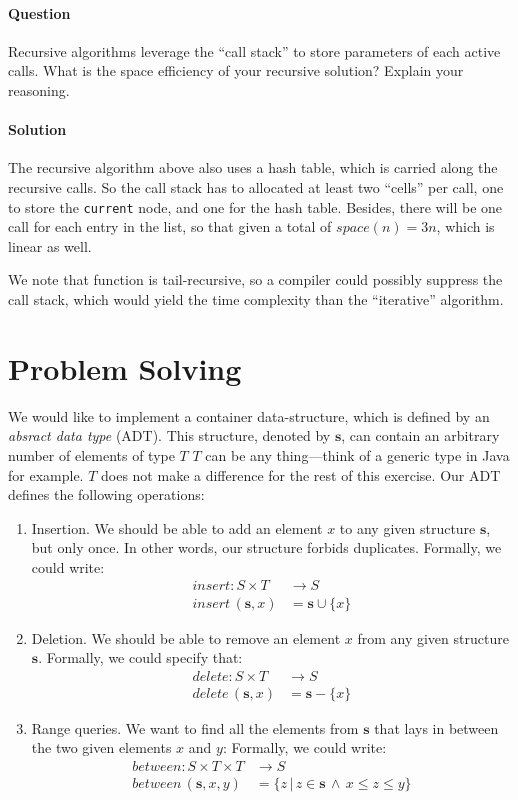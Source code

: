 \documentclass{article}
\begin{document}
\paragraph{Question} Recursive algorithms leverage the ``call stack''
to store parameters of each active calls. What is the space efficiency
of your recursive solution?  Explain your reasoning.

\paragraph{Solution} The recursive algorithm above also uses a hash
table, which is carried along the recursive calls. So the call stack
has to allocated at least two ``cells'' per call, one to store the
\texttt{current} node, and one for the hash table. Besides, there will
be one call for each entry in the list, so that given a total of
$space(n) = 3n$, which is linear as well.

We note that function is tail-recursive, so a compiler could possibly
suppress the call stack, which would yield the time complexity than
the ``iterative'' algorithm.

\section{Problem Solving}
We would like to implement a container data-structure, which is
defined by an \emph{absract data type} (ADT). This structure, denoted
by $\mathbf{s}$, can contain an arbitrary number of elements of type
$T$ $T$ can be any thing---think of a generic type in Java for
example. $T$ does not make a difference for the rest of this
exercise. Our ADT defines the following operations:
\begin{enumerate}
\item Insertion. We should be able to add an element $x$ to any given
  structure $\mathbf{s}$, but only once. In other words, our
  structure forbids duplicates. Formally, we could write:
  \begin{align*}
    \mathit{insert}: S \times T & \to S \\
    \mathit{insert}\, (\mathbf{s}, x) &= \mathbf{s} \cup \{ x \}
  \end{align*}
\item Deletion. We should be able to remove an element $x$ from any given 
  structure $\mathbf{s}$. Formally, we could specify that: 
  \begin{align*}
    \mathit{delete}: S \times T & \to S \\
    \mathit{delete} \, (\mathbf{s}, x) & = \mathbf{s} - \{ x \}
  \end{align*}
\item Range queries. We want to find all the elements from
  $\mathbf{s}$ that lays in between the two given elements $x$ and
  $y$: Formally, we could write:
  \begin{align*}
    \mathit{between}: S \times T \times T & \to S \\
    \mathit{between} \, (\mathbf{s}, x, y) & = \{ z \, | \, z \in \mathbf{s} \, \land \, x \leq z
    \leq y \}
    \end{align*}
\end{enumerate}
\end{document}
